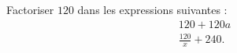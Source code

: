 
\begin{exercice}\label{exoSeconde-0022}

Factoriser \( 120\) dans les expressions suivantes :
\begin{subequations}
    \begin{align}
        120+120a\\
        \frac{ 120 }{ x }+240.
    \end{align}
\end{subequations}

\end{exercice}
